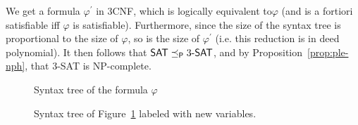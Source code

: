 \begin{example}
    We get a formula \(\varphi^\prime\) in 3CNF, which is logically equivalent to\(\varphi\) (and is a fortiori satisfiable iff \(\varphi\) is satisfiable). Furthermore, since the size of the syntax tree is proportional to the size of \(\varphi\), so is the size of \(\varphi^\prime\) (i.e. this reduction is in deed polynomial). It then follows that
    \(\textsf{SAT} \preceq_\textsf{P} 3\textsf{-SAT}\), and by Proposition~\ref{prop:ple-nph}, that 3-\textsf{SAT} is \textsf{NP}-complete.
    \begin{figure}[htb]
        \begin{center}
        \end{center}
        \caption{Syntax tree of the formula \(\varphi\)}
        \label{fig:3sat-npc-syntax-tree}
    \end{figure}

    \begin{figure}[htb]
        \begin{center}
        \end{center}
        \caption{Syntax tree of Figure~\ref{fig:3sat-npc-syntax-tree} labeled with new variables.}
        \label{fig:3sat-npc-var-tree}
    \end{figure}
\end{example}

